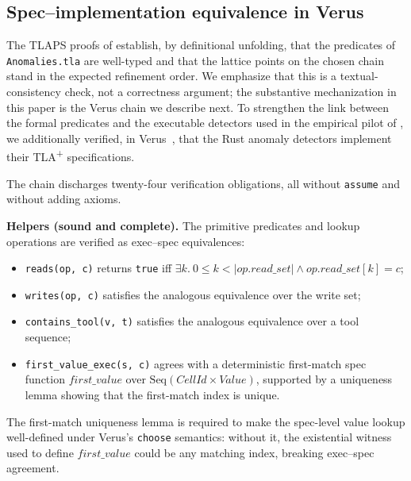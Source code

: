 \documentclass[journal,compsoc,10pt]{IEEEtran}
\theoremstyle{definition}
\theoremstyle{remark}
\newcommand{\fld}[1]{\mathit{#1}}
\begin{document}
\subsection{Spec--implementation equivalence in Verus}
\label{sec:verus-equivalence}
The TLAPS proofs of  establish, by
definitional unfolding, that the predicates of
\texttt{Anomalies.tla} are well-typed and that the lattice points
on the chosen chain stand in the expected refinement order. We
emphasize that this is a textual-consistency check, not a
correctness argument; the substantive mechanization in this paper
is the Verus chain we describe next. To
strengthen the link between the formal predicates and the
executable detectors used in the empirical pilot of
, we additionally verified, in
Verus~\cite{Lattuada2023Verus}, that the Rust anomaly detectors
implement their TLA\textsuperscript{+} specifications.

The chain discharges twenty-four verification obligations, all
without \texttt{assume} and without adding axioms.

\medskip
\noindent\textbf{Helpers (sound and complete).}
The primitive predicates and lookup operations are verified as
exec--spec equivalences:
\begin{itemize}
    \item \texttt{reads(op,\,c)} returns \texttt{true} iff
    $\exists k.\ 0 \le k < |\fld{op.read\_set}| \land
    \fld{op.read\_set}[k] = c$;
    \item \texttt{writes(op,\,c)} satisfies the analogous equivalence
    over the write set;
    \item \texttt{contains\_tool(v,\,t)} satisfies the analogous
    equivalence over a tool sequence;
    \item \texttt{first\_value\_exec(s,\,c)} agrees with a
    deterministic first-match spec function $\fld{first\_value}$
    over $\mathrm{Seq}(\fld{CellId} \times \fld{Value})$, supported
    by a uniqueness lemma showing that the first-match index is
    unique.
\end{itemize}
The first-match uniqueness lemma is required to make the spec-level
value lookup well-defined under Verus's \texttt{choose} semantics:
without it, the existential witness used to define
$\fld{first\_value}$ could be any matching index, breaking
exec--spec agreement.
\end{document}
